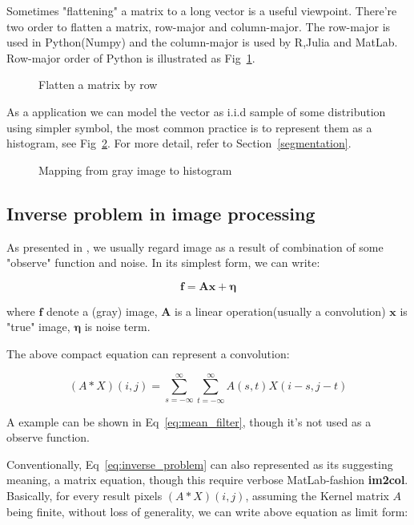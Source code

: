 \documentclass{article}
\begin{document}
Sometimes "flattening" a matrix to a long vector is a useful viewpoint. There're two order to flatten a matrix,
row-major and column-major. The row-major is used in Python(Numpy) and the column-major is used by R,Julia and MatLab.
Row-major order of Python is illustrated as Fig~\ref{fig:flatten_matrix}.

\begin{figure}[htb]
  \centering
  
  \caption{Flatten a matrix by row}
  \label{fig:flatten_matrix}
\end{figure}


As a application we can model the vector as i.i.d sample of some distribution using simpler symbol, the most 
common practice is to represent them as a histogram, see Fig~\ref{fig:map_gray_to_hist}. 
For more detail, refer to Section~\ref{segmentation}.

\begin{figure}[htb]
  \centering
  
  \caption{Mapping from gray image to histogram}
  \label{fig:map_gray_to_hist}
\end{figure}

\subsection{Inverse problem in image processing}

As presented in \cite{dong2015image}, we usually regard image as a result of combination of some "observe"
function and noise. In its simplest form, we can write:

\begin{equation}
\mathbf{f} = \mathbf{A} \mathbf{x} + \mathbf{\eta}
\label{eq:inverse_problem}
\end{equation}

where $\mathbf{f}$ denote a (gray) image, $\mathbf{A}$ is a linear operation(usually a convolution)
$\mathbf{x}$ is "true" image, $\mathbf{\eta}$ is noise term.

The above compact equation can represent a convolution:

$$
(A*X)(i,j) = \sum_{s=-\infty}^\infty \sum_{t=-\infty}^\infty A(s,t)X(i-s,j-t)
$$

A example can be shown in Eq~\ref{eq:mean_filter}, though it's not used as a observe function.

Conventionally, Eq~\ref{eq:inverse_problem} can also represented as its suggesting meaning, 
a matrix equation, though this require verbose MatLab-fashion {\bf im2col}. 
Basically, for every result pixels $(A*X)(i,j)$, assuming the Kernel matrix $A$ being finite,
without loss of generality, we can write above equation as limit form:
\end{document}
